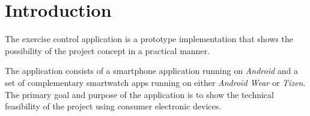 \section{Introduction}

The exercise control application is a prototype implementation that shows the
possibility of the project concept in a practical manner.

The application consists of a smartphone application running on
\textit{Android} and a set of complementary smartwatch apps running on either
\textit{Android Wear} or \textit{Tizen}. The primary goal and purpose of the
application is to show the technical feasibility of the project using consumer
electronic devices.
